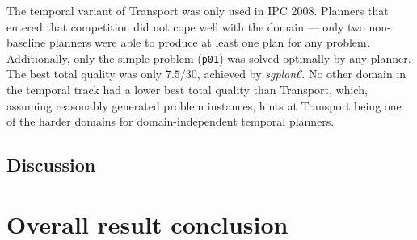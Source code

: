 
The temporal variant of Transport was only used in IPC 2008.
Planners that entered that competition did not cope well with the domain
--- only two non-baseline planners were able to produce at least one plan
for any problem. Additionally, only the simple problem (\verb+p01+) was solved
optimally by any planner. The best total quality was only $7.5/30$, achieved by
\textit{sgplan6}. No other domain in the temporal track had a lower best total quality
than Transport, which, assuming reasonably generated problem instances, hints
at Transport being one of the harder domains for domain-independent temporal planners.


\subsection{Discussion}

\section{Overall result conclusion}


